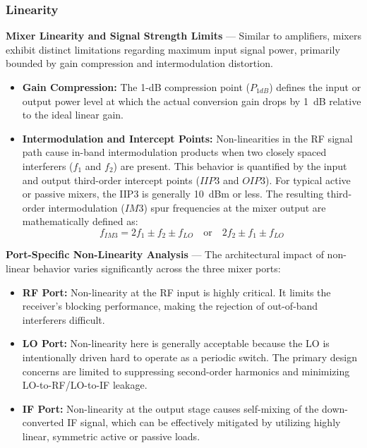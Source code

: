 \subsubsection{Linearity}

\textbf{Mixer Linearity and Signal Strength Limits} --- Similar to amplifiers, mixers exhibit distinct limitations regarding maximum input signal power, primarily bounded by gain compression and intermodulation distortion.

\begin{itemize}
    \item \textbf{Gain Compression:} The 1-dB compression point ($P_{1dB}$) defines the input or output power level at which the actual conversion gain drops by 1~dB relative to the ideal linear gain.
    \item \textbf{Intermodulation and Intercept Points:} Non-linearities in the RF signal path cause in-band intermodulation products when two closely spaced interferers ($f_1$ and $f_2$) are present. This behavior is quantified by the input and output third-order intercept points ($IIP3$ and $OIP3$). For typical active or passive mixers, the IIP3 is generally 10~dBm or less. The resulting third-order intermodulation ($IM3$) spur frequencies at the mixer output are mathematically defined as:
\begin{equation}
f_{IM3} = 2f_1 \pm f_2 \pm f_{LO} \quad \text{or} \quad 2f_2 \pm f_1 \pm f_{LO}
\end{equation}
\end{itemize}

\textbf{Port-Specific Non-Linearity Analysis} --- The architectural impact of non-linear behavior varies significantly across the three mixer ports:

\begin{itemize}
    \item \textbf{RF Port:} Non-linearity at the RF input is highly critical. It limits the receiver's blocking performance, making the rejection of out-of-band interferers difficult.
    \item \textbf{LO Port:} Non-linearity here is generally acceptable because the LO is intentionally driven hard to operate as a periodic switch. The primary design concerns are limited to suppressing second-order harmonics and minimizing LO-to-RF/LO-to-IF leakage.
    \item \textbf{IF Port:} Non-linearity at the output stage causes self-mixing of the down-converted IF signal, which can be effectively mitigated by utilizing highly linear, symmetric active or passive loads.
\end{itemize}

